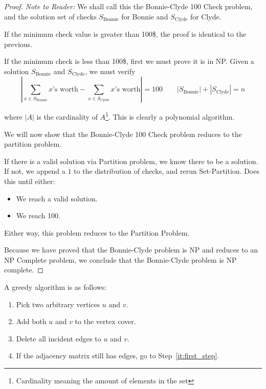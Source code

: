 \documentclass[12pt,listof=totoc,toc=sectionentrywithdots]{scrartcl}
\begin{document}
\begin{proof}
    \textit{Note to Reader:} We shall call this the Bonnie-Clyde 100 Check problem, and the solution set of checks $S_\text{Bonnie}$ for Bonnie and $S_\text{Clyde}$ for Clyde.

    If the minimum check value is greater than \num{100}\$, the proof is identical to the previous.

    If the minimum check is less than \num{100}\$, first we must prove it is in NP. Given a solution $S_\text{Bonnie}$ and $S_\text{Clyde}$, we must verify
    \begin{equation*}
        \left|\sum_{x \in S_\text{Bonnie}} \text{$x$'s worth} - \sum_{x \in S_\text{Cylde}} \text{$x$'s worth}\right| = 100 \qquad
        |S_\text{Bonnie}| + |S_\text{Clyde}| = n
    \end{equation*}

    where $|A|$ is the cardinality of $A$\footnote{Cardinality meaning the amount of elements in the set}. This is clearly a polynomial algorithm.

    We will now show that the Bonnie-Clyde 100 Check problem reduces to the partition problem.

    If there is a valid solution via Partition problem, we know there to be a solution. If not, we append a $1$ to the distribution of checks, and rerun Set-Partition. Does this until either:

    \begin{itemize}
        \item We reach a valid solution.
        \item We reach \num{100}.
    \end{itemize}

    Either way, this problem reduces to the Partition Problem.

    Because we have proved that the Bonnie-Clyde problem is NP and reduces to an NP Complete problem, we conclude that the Bonnie-Clyde problem is NP complete.
\end{proof}

\problem{}
A greedy algorithm is as follows:

\begin{enumerate}
    \item\label{it:first_step} Pick two arbitrary vertices $u$ and $v$.
    \item Add both $u$ and $v$ to the vertex cover.
    \item Delete all incident edges to $u$ and $v$.
    \item If the adjacency matrix still has edges, go to Step~\ref{it:first_step}.
\end{enumerate}
\end{document}
